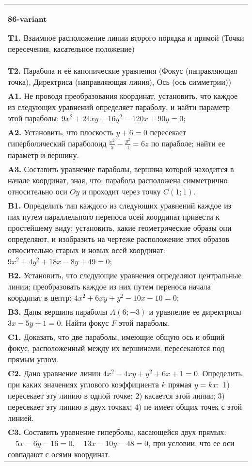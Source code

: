 \documentclass{article}
\begin{document}
\begin{tabular}{m{17cm}}
\textbf{86-variant}
\newline

\textbf{T1.} Взаимное расположение линии второго порядка и прямой (Точки пересечения, касательное положение) \\
\textbf{T2.} Парабола и её канонические уравнения (Фокус (направляющая точка), Директриса (направляющая линия), Ось (ось симметрии)) \\
\textbf{A1.} Не проводя преобразования координат, установить, что каждое из следующих уравнений определяет параболу, и найти параметр этой параболы: $9 x^2+24 x y+16 y^2-120 x+90 y=0$; \\
\textbf{A2.} Установить, что плоскость $y+6=0$ пересекает гиперболический параболоид $\frac{x^2}{5}-\frac{y^2}{4}=6 z$ по параболе; найти ее параметр и вершину. \\
\textbf{A3.} Составить уравнение параболы, вершина которой находится в начале координат, зная, что: парабола расположена симметрично относительно оси $O y$ и проходит через точку $C(1 ; 1)$. \\
\textbf{B1.} Определить тип каждого из следующих уравнений каждое из них путем параллельного переноса осей координат привести к простейшему виду; установить, какие геометрические образы они определяют, и изобразить на чертеже расположение этих образов относительно старых и новых осей координат: $9 x^2+4 y^2+18 x-8 y+49=0$; \\
\textbf{B2.} Установить, что следующие уравнения определяют центральные линии; преобразовать каждое из них путем переноса начала координат в центр: $4 x^2+6 x y+y^2-10 x-10=0$; \\
\textbf{B3.} Даны вершина параболы $A(6 ;-3)$ и уравнение ее директрисы $3 x-5 y+1=0$. Найти фокус $F$ этой параболы. \\
\textbf{C1.} Доказать, что две параболы, имеющие общую ось и общий фокус, расположенный между их вершинами, пересекаются под прямым углом. \\
\textbf{C2.} Дано уравнение линии $4 x^2-4 x y+y^2+6 x+1=0$. Определить, при каких значениях углового коэффициента $k$ прямая $y=k x:$ 1) пересекает эту линию в одной точке; 2) касается этой линии; 3) пересекает эту линию в двух точках; 4) не имеет общих точек с этой линией. \\
\textbf{C3.} Составить уравнение гиперболы, касающейся двух прямых: $\quad 5 x-6 y-16=0, \quad 13 x-10 y-48=0$, при условии, что ее оси совпадают с осями координат. \\

\end{tabular}
\vspace{1cm}
\end{document}
